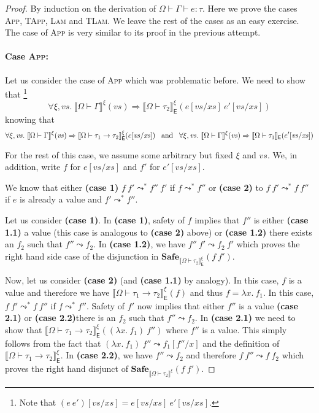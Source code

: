 \documentclass{article}
\newcommand{\EXP}{\mathsf{E}}
\newcommand{\semtyp}[2]{\llbracket #2 \rrbracket_{#1}}
\begin{document}
\begin{proof}
By induction on the derivation of $\Omega \vdash \Gamma \vdash e : \tau$.
Here we prove the cases \textsc{App}, \textsc{TApp},
\textsc{Lam} and \textsc{TLam}.
We leave the rest of the cases as an easy exercise.
The case of \textsc{App} is very similar to its proof in the previous attempt.

\paragraph{Case \textsc{App}:}
Let us consider the case of \textsc{App} which was problematic before.
We need to show that
\footnote{Note that
$(e~e')[\mathit{vs}/\mathit{xs}] = e[\mathit{vs}/\mathit{xs}]~e'[\mathit{vs}/\mathit{xs}]$.}
\[
\forall \xi, \mathit{vs}.~\semtyp{}{\Omega \vdash \Gamma}^{\xi}(\mathit{vs}) \Rightarrow
\semtyp{\EXP}{\Omega \vdash \tau_2}^{\xi}(e[\mathit{vs}/\mathit{xs}]~e'[\mathit{vs}/\mathit{xs}])
\]
knowing that
\[
\forall \xi, \mathit{vs}.~\semtyp{}{\Omega \vdash \Gamma}^{\xi}(\mathit{vs}) \Rightarrow
\semtyp{\EXP}{\Omega \vdash \tau_1 \to \tau_2}^{\xi}(e[\mathit{vs}/\mathit{xs}])
\hspace{0.5em}\text{ and }\hspace{0.5em}
\forall \xi, \mathit{vs}.~\semtyp{}{\Omega \vdash \Gamma}^{\xi}(\mathit{vs}) \Rightarrow
\semtyp{\EXP}{\Omega \vdash \tau_1
}(e'[\mathit{vs}/\mathit{xs}])
\]

For the rest of this case, we assume some arbitrary but fixed $\xi$ and $\mathit{vs}$.
We, in addition, write $f$ for $e[\mathit{vs}/\mathit{xs}]$
and $f'$ for $e'[\mathit{vs}/\mathit{xs}]$.

We know that either \textbf{(case 1)} $f~f' \leadsto^* f''~f'$ if $f \leadsto^* f''$
or \textbf{(case 2)} to $f~f' \leadsto^* f~f''$ if $e$ is already a value and $f' \leadsto^* f''$.

Let us consider \textbf{(case 1)}.
In \textbf{(case 1)}, safety of $f$ implies that $f''$ is either \textbf{(case 1.1)} a value (this case is analogous to \textbf{(case 2)} above) or \textbf{(case 1.2)} there exists an $f_2$ such that $f'' \leadsto f_2$. In \textbf{(case 1.2)}, we have $f''~f' \leadsto f_2~f'$ which proves
the right hand side case of the disjunction in $\mathbf{Safe}_{\semtyp{\EXP}{\Omega \vdash \tau_2}^{\xi}}(f~f')$.

Now, let us consider \textbf{(case 2)} (and \textbf{(case 1.1)} by analogy). In this case, $f$ is
a value and therefore we have $\semtyp{\EXP}{\Omega \vdash \tau_1 \to \tau_2}^{\xi}(f)$ and thus $f = \lambda x.~f_1$.
In this case, $f~f' \leadsto^* f~f''$ if $f \leadsto^* f''$. Safety of $f'$ now implies that
either $f''$ is a value \textbf{(case 2.1)} or \textbf{(case 2.2)}there is an $f_2$ such that
$f'' \leadsto f_2$.
In \textbf{(case 2.1)} we need to show that $\semtyp{\EXP}{\Omega \vdash \tau_1 \to \tau_2}^{\xi}((\lambda x.~f_1)~f'')$ where $f''$ is a value. This simply follows from the fact that $(\lambda x.~f_1)~f'' \leadsto f_1[f''/x]$ and the definition of $\semtyp{\EXP}{\Omega \vdash \tau_1 \to \tau_2}^{\xi}$.
In \textbf{(case 2.2)}, we have $f'' \leadsto f_2$ and therefore $f~f'' \leadsto f~f_2$ which
proves the right hand disjunct of $\mathbf{Safe}_{\semtyp{}{\Omega \vdash \tau_2}^{\xi}}(f~f')$.


\end{proof}
\end{document}
